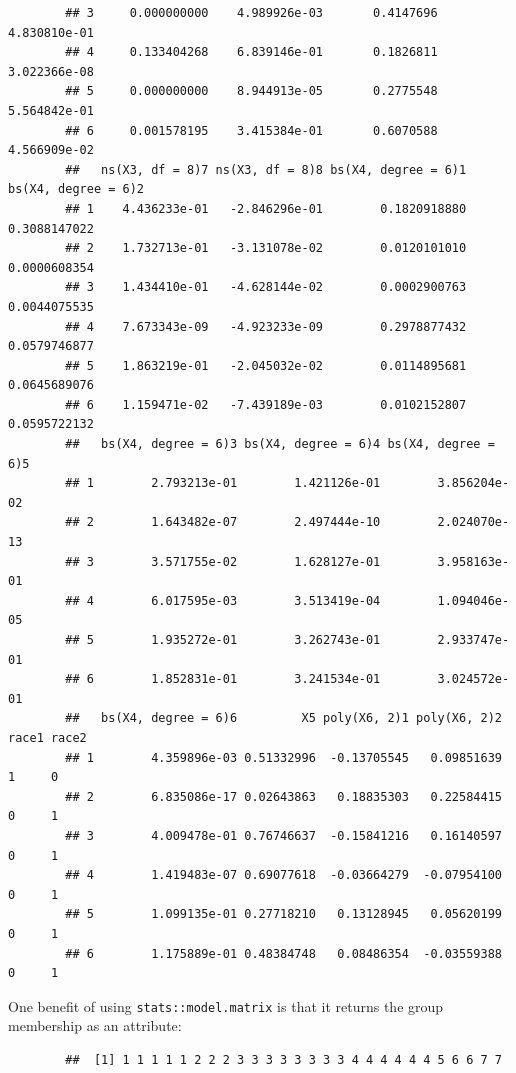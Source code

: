 \begin{knitrout}
\begin{kframe}
\begin{verbatim}
		## 3     0.000000000    4.989926e-03       0.4147696    4.830810e-01
		## 4     0.133404268    6.839146e-01       0.1826811    3.022366e-08
		## 5     0.000000000    8.944913e-05       0.2775548    5.564842e-01
		## 6     0.001578195    3.415384e-01       0.6070588    4.566909e-02
		##   ns(X3, df = 8)7 ns(X3, df = 8)8 bs(X4, degree = 6)1 bs(X4, degree = 6)2
		## 1    4.436233e-01   -2.846296e-01        0.1820918880        0.3088147022
		## 2    1.732713e-01   -3.131078e-02        0.0120101010        0.0000608354
		## 3    1.434410e-01   -4.628144e-02        0.0002900763        0.0044075535
		## 4    7.673343e-09   -4.923233e-09        0.2978877432        0.0579746877
		## 5    1.863219e-01   -2.045032e-02        0.0114895681        0.0645689076
		## 6    1.159471e-02   -7.439189e-03        0.0102152807        0.0595722132
		##   bs(X4, degree = 6)3 bs(X4, degree = 6)4 bs(X4, degree = 6)5
		## 1        2.793213e-01        1.421126e-01        3.856204e-02
		## 2        1.643482e-07        2.497444e-10        2.024070e-13
		## 3        3.571755e-02        1.628127e-01        3.958163e-01
		## 4        6.017595e-03        3.513419e-04        1.094046e-05
		## 5        1.935272e-01        3.262743e-01        2.933747e-01
		## 6        1.852831e-01        3.241534e-01        3.024572e-01
		##   bs(X4, degree = 6)6         X5 poly(X6, 2)1 poly(X6, 2)2 race1 race2
		## 1        4.359896e-03 0.51332996  -0.13705545   0.09851639     1     0
		## 2        6.835086e-17 0.02643863   0.18835303   0.22584415     0     1
		## 3        4.009478e-01 0.76746637  -0.15841216   0.16140597     0     1
		## 4        1.419483e-07 0.69077618  -0.03664279  -0.07954100     0     1
		## 5        1.099135e-01 0.27718210   0.13128945   0.05620199     0     1
		## 6        1.175889e-01 0.48384748   0.08486354  -0.03559388     0     1
		\end{verbatim}
	\end{kframe}
\end{knitrout}

One benefit of using \texttt{stats::model.matrix} is that it returns the group membership as an attribute:

\begin{knitrout}\scriptsize
	\color{fgcolor}\begin{kframe}
		\begin{alltt}
			 \hlstd{)}
		\end{alltt}
		\begin{verbatim}
		##  [1] 1 1 1 1 1 2 2 2 3 3 3 3 3 3 3 3 4 4 4 4 4 4 5 6 6 7 7
		\end{verbatim}
	\end{kframe}
\end{knitrout}

